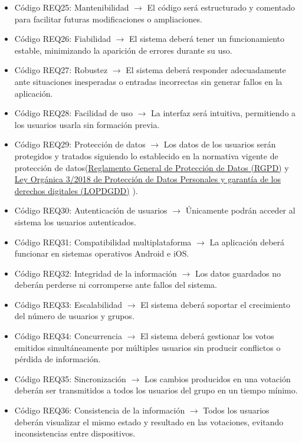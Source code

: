 \begin{itemize}
    \item Código REQ25: Mantenibilidad $\rightarrow$ El código será estructurado y comentado para facilitar futuras modificaciones o ampliaciones.
    \item Código REQ26: Fiabilidad $\rightarrow$ El sistema deberá tener un funcionamiento estable, minimizando la aparición de errores durante su uso.
    \item Código REQ27: Robustez $\rightarrow$ El sistema deberá responder adecuadamente ante situaciones inesperadas o entradas incorrectas sin generar fallos en la aplicación.
    \item Código REQ28: Facilidad de uso $\rightarrow$ La interfaz será intuitiva, permitiendo a los usuarios usarla sin formación previa.
    \item Código REQ29: Protección de datos $\rightarrow$ Los datos de los usuarios serán protegidos y tratados siguiendo lo establecido en la normativa vigente de protección de datos(\href{https://www.boe.es/buscar/doc.php?id=DOUE-L-2016-80807}{Reglamento General de Protección de Datos (RGPD)} \cite{RGPD} y \href{https://www.boe.es/eli/es/lo/2018/12/05/3/con}{Ley Orgánica 3/2018 de Protección de Datos Personales y garantía de los derechos digitales (LOPDGDD)} \cite{LOPDGDD}).
    \item Código REQ30: Autenticación de usuarios $\rightarrow$ Únicamente podrán acceder al sistema los usuarios autenticados.
    \item Código REQ31: Compatibilidad multiplataforma $\rightarrow$ La aplicación deberá funcionar en sistemas operativos Android e iOS.
    \item Código REQ32: Integridad de la información $\rightarrow$ Los datos guardados no deberán perderse ni corromperse ante fallos del sistema.
    \item Código REQ33: Escalabilidad $\rightarrow$ El sistema deberá soportar el crecimiento del número de usuarios y grupos.
    \item Código REQ34: Concurrencia $\rightarrow$ El sistema deberá gestionar los votos emitidos simultáneamente por múltiples usuarios sin producir conflictos o pérdida de información. 
    \item Código REQ35: Sincronización $\rightarrow$ Los cambios producidos en una votación deberán ser transmitidos a todos los usuarios del grupo en un tiempo mínimo.
    \item Código REQ36: Consistencia de la información $\rightarrow$ Todos los usuarios deberán visualizar el mismo estado y resultado en las votaciones, evitando inconsistencias entre dispositivos.
\end{itemize}


